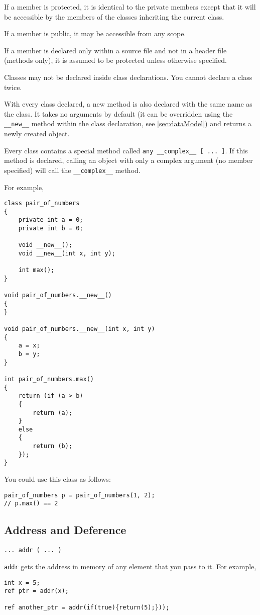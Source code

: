 \documentclass[10pt,a4paper]{article}
\begin{document}
If a member is protected, it is identical to the private members except that it will be accessible by the members of the classes inheriting the current class.

If a member is public, it may be accessible from any scope. 

If a member is declared only within a source file and not in a header file (methods only), it is assumed to be protected unless otherwise specified.

Classes may not be declared inside class declarations. You cannot declare a class twice.

With every class declared, a new method is also declared with the same name as the class. It takes no arguments by default (it can be overridden using the \verb|__new__| method within the class declaration, see \ref{sec:dataModel}) and returns a newly created object.

Every class contains a special method called \verb|any __complex__ [ ... ]|. If this method is declared, calling an object with only a complex argument (no member specified) will call the \verb|__complex__| method.

For example,
\begin{verbatim}
class pair_of_numbers
{
    private int a = 0;
    private int b = 0;
    
    void __new__();
    void __new__(int x, int y);
    
    int max();
}

void pair_of_numbers.__new__()
{
}

void pair_of_numbers.__new__(int x, int y)
{
    a = x;
    b = y;
}

int pair_of_numbers.max()
{
    return (if (a > b)
    {
        return (a);
    }
    else
    {
        return (b);
    });
}
\end{verbatim}

You could use this class as follows:
\begin{verbatim}
pair_of_numbers p = pair_of_numbers(1, 2);
// p.max() == 2
\end{verbatim}

\subsection{Address and Deference}
\begin{verbatim}
... addr ( ... )
\end{verbatim}

\verb|addr| gets the address in memory of any element that you pass to it. For example,
\begin{verbatim}
int x = 5;
ref ptr = addr(x);

ref another_ptr = addr(if(true){return(5);}));
\end{verbatim}
\end{document}
